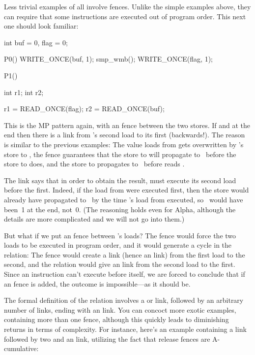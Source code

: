 Less trivial examples of  all involve fences.
Unlike the simple examples above, they can require that some
instructions are executed out of program order.
This next one should look familiar:

\begin{VerbatimU}
	int buf = 0, flag = 0;

	P0()
	{
		WRITE_ONCE(buf, 1);
		smp_wmb();
		WRITE_ONCE(flag, 1);
	}

	P1()
	{
		int r1;
		int r2;

		r1 = READ_ONCE(flag);
		r2 = READ_ONCE(buf);
	}
\end{VerbatimU}

This is the MP pattern again, with an  fence between the two
stores.
If  and  at the end then there is a  link
from 's second load to its first (backwards!).
The reason is similar to the previous examples:
The value  loads from  gets overwritten by 's
store to , the fence guarantees that the store to 
will propagate to~ before the store to  does, and the
store to  propagates to~ before  reads .

The  link says that in order to obtain the 
result,  must execute its second load before the first.
Indeed, if the load from  were executed first, then the
 store would already have propagated to~ by the
time 's load from  executed, so ~would have
been~1 at the end, not~0.
(The reasoning holds even for Alpha, although the details are more
complicated and we will not go into them.)

But what if we put an  fence between 's loads?
The fence would force the two loads to be executed in program order,
and it would generate a cycle in the  relation:
The fence would create a  link (hence an  link) from
the first load to the second, and the  relation would give
an  link from the second load to the first.
Since an instruction can't execute before itself, we are forced to
conclude that if an  fence is added, the 
outcome is impossible---as it should be.

The formal definition of the  relation involves a 
or  link, followed by an arbitrary number of 
links, ending with an  link.
You can concoct more exotic examples, containing more than one fence,
although this quickly leads to diminishing returns in terms of complexity.
For instance, here's an example containing a  link
followed by two  and an  link, utilizing
the fact that release fences are A-cumulative:


